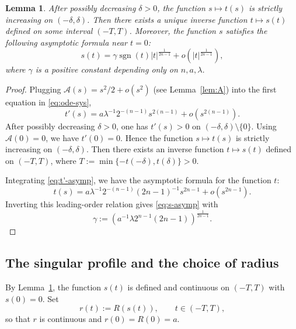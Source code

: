 \documentclass[12pt,letterpaper]{amsart}
\theoremstyle{definition}
\theoremstyle{plain}
\newtheorem{lemma}[definition]{Lemma}
\numberwithin{equation}{section}
\begin{document}
\begin{lemma}\label{lem:inverse}
    After possibly decreasing $\delta>0$, the function $s\mapsto t(s)$ is strictly increasing on $(-\delta,\delta)$.
    Then there exists a unique inverse function $t\mapsto s(t)$ defined on some interval $(-T,T)$.
    Moreover, the function $s$ satisfies the following asymptotic formula near $t=0$:
    \begin{equation}\label{eq:s-asymp}
        s(t)=\gamma\operatorname{sgn}(t)|t|^{\frac{1}{2n-1}}+o(|t|^{\frac{1}{2n-1}}),
    \end{equation}
    where $\gamma$ is a positive constant depending only on $n,a,\lambda$.
\end{lemma}
\begin{proof}
    Plugging $\mathcal{A}(s)=s^2/2+o(s^2)$ (see Lemma~\ref{lem:A}) into the first equation in \eqref{eq:ode-sys},
    \begin{equation}\label{eq:t'-asymp}
        t'(s)=a\lambda^{-1}2^{-(n-1)}s^{2(n-1)}+o(s^{2(n-1)}).
    \end{equation}
    After possibly decreasing $\delta>0$, one has $t'(s)>0$ on $(-\delta,\delta)\setminus\{0\}$.
    Using $\mathcal{A}(0)=0$, we have $t'(0)=0$.
    Hence the function $s\mapsto t(s)$ is strictly increasing on $(-\delta,\delta)$.
    Then there exists an inverse function $t\mapsto s(t)$ defined on $(-T,T)$, where $T:=\min\{-t(-\delta),t(\delta)\}>0$.

    Integrating \eqref{eq:t'-asymp}, we have the asymptotic formula for the function $t$:
    \begin{equation}\label{eq:t-asymp}
        t(s)=a\lambda^{-1}2^{-(n-1)}(2n-1)^{-1}s^{2n-1}+o(s^{2n-1}).
    \end{equation}
    Inverting this leading-order relation gives \eqref{eq:s-asymp} with
    \[
    \gamma:=(a^{-1}\lambda 2^{n-1}(2n-1))^{\frac{1}{2n-1}}.
    \]
\end{proof}

\subsection{The singular profile and the choice of radius}\label{ss:profile}

By Lemma~\ref{lem:inverse}, the function $s(t)$ is defined and continuous on $(-T,T)$ with
$s(0)=0$. Set
\[
r(t):=R(s(t)),\qquad t\in(-T,T),
\]
so that $r$ is continuous and $r(0)=R(0)=a$.
\end{document}
